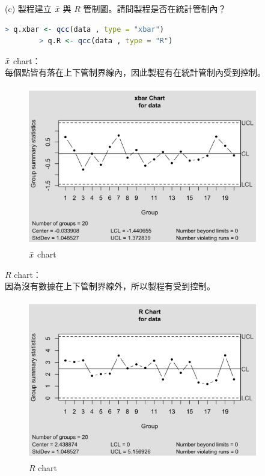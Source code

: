 (c) 製程建立 $\Bar{x}$ 與 $R$ 管制圖。請問製程是否在統計管制內？
    \begin{lstlisting}[language=R]
        > q.xbar <- qcc(data , type = "xbar")
        > q.R <- qcc(data , type = "R")
    \end{lstlisting}
        
    $\Bar{x}$ chart：\\
    每個點皆有落在上下管制界線內，因此製程有在統計管制內受到控制。
            \begin{figure}[ht]
                \centering
                \includegraphics[width=10cm, height=7cm]{figures/Xbar_Chart.png}
                \caption{$\Bar{x}$ chart}
                \label{fig:1}
            \end{figure}
            
        \pagebreak
            
    $R$ chart：\\
    因為沒有數據在上下管制界線外，所以製程有受到控制。
            \begin{figure}[ht]
                \centering
                \includegraphics[width=10cm, height=7cm]{figures/R_Chart.png}
                \caption{$R$ chart}
                \label{fig:2}
            \end{figure}
        